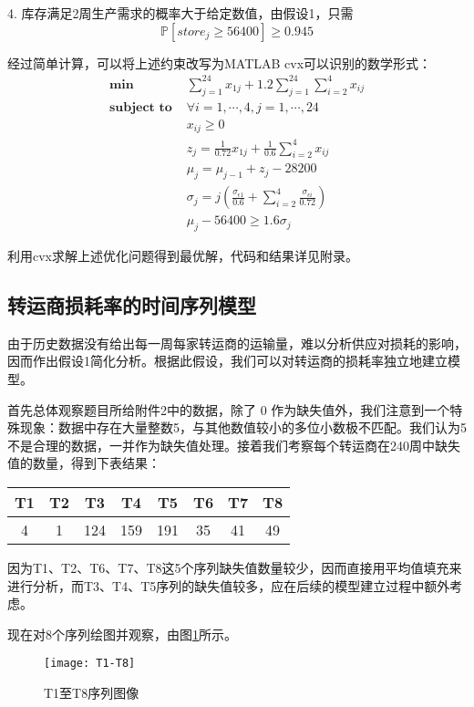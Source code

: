\documentclass{my_paper}
\def\lsb{\left[}
\def\rsb{\right]}
\newcommand{\prob}[1]{\mathbb{P}\lsb #1\rsb} %
\begin{document}
  4. 库存满足2周生产需求的概率大于给定数值，由假设1，只需
  $$\prob{store_j \ge 56400} \ge 0.945 $$
  
  经过简单计算，可以将上述约束改写为MATLAB cvx可以识别的数学形式：
  \begin{align*}
    	\textbf{min  } &  \sum_{j=1}^{24}x_{1j} +  1.2 \sum_{j=1}^{24}\sum_{i=2}^{4}x_{ij} \\
    	\textbf{subject to  }& \forall i=1,\cdots,4 , j=1,\cdots,24\\
      & x_{ij}\ge 0\\
    	& z_j=\frac{1}{0.72}x_{1j} + \frac{1}{0.6}\sum_{i=2}^{4}x_{ij} \\
      & \mu_j=\mu_{j-1}+z_j-28200\\
      & \sigma_j=j\left(  \frac{\sigma_{\epsilon 1}}{0.6}+\sum_{i=2}^{4} \frac{\sigma_{\epsilon i}}{0.72}\right) \\
      & \mu_j -56400 \ge 1.6\sigma_j
    \end{align*}
    
    利用cvx求解上述优化问题得到最优解，代码和结果详见附录。


\subsection{转运商损耗率的时间序列模型}
由于历史数据没有给出每一周每家转运商的运输量，难以分析供应对损耗的影响，因而作出假设1简化分析。根据此假设，我们可以对转运商的损耗率独立地建立模型。

首先总体观察题目所给附件2中的数据，除了 0 作为缺失值外，我们注意到一个特殊现象：数据中存在大量整数5，与其他数值较小的多位小数极不匹配。我们认为5不是合理的数据，一并作为缺失值处理。接着我们考察每个转运商在240周中缺失值的数量，得到下表结果：
	
	\begin{table}[h]
		\centering
		\begin{tabular}{cccccccc}
			\hline
			T1 & T2& T3& T4& T5& T6& T7& T8  \\
			\hline
			4   &1 &124 &159 &191 & 35 & 41&  49 \\ 
		\end{tabular}
	\end{table}
  
   因为T1、T2、T6、T7、T8这5个序列缺失值数量较少，因而直接用平均值填充来进行分析，而T3、T4、T5序列的缺失值较多，应在后续的模型建立过程中额外考虑。
  
现在对8个序列绘图并观察，由图\ref{1-8}所示。
	\begin{figure}[htbp]
		\centering
		\texttt{[image: T1-T8]}
		\caption{T1至T8序列图像}\label{1-8}
	\end{figure}
  
\end{document}
